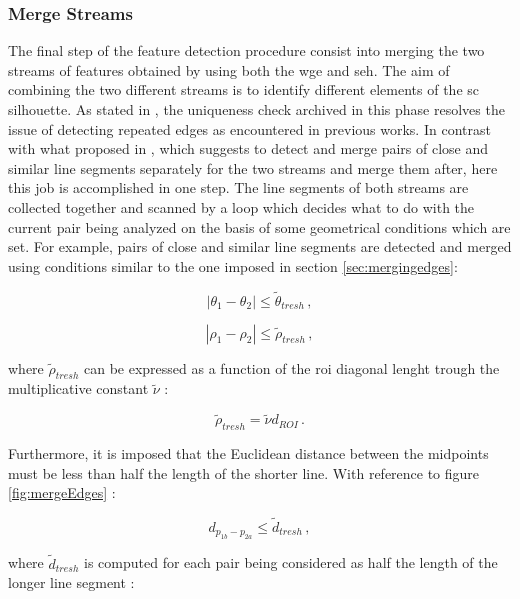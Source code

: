 \subsubsection{Merge Streams}
The final step of  the feature detection procedure consist into merging the two streams of features obtained by using both the \acrshort{wge} and \acrshort{seh}. The aim of combining the two different streams is to identify different elements of the \acrshort{sc} silhouette. As stated in \cite{Sharma2018}, the uniqueness check archived in this phase resolves the issue of detecting repeated edges as encountered in previous works. 
In contrast with what proposed in \cite{Sharma2018}, which suggests to detect and merge pairs of close and similar line segments separately for the two streams and merge them after, here this job is accomplished in one step. The line segments of both streams are collected together and scanned by a loop which decides what to do with the current pair being analyzed on the basis of some geometrical conditions which are set.
For example, pairs of close and similar line segments are detected and merged using conditions similar to the one imposed in section \ref{sec:mergingedges}: 

\begin{equation}
|\theta_1 - \theta_2| \leqslant \tilde{\theta}_{tresh} \,,
\end{equation}

\begin{equation}
|\rho_1 - \rho_2| \leqslant	\tilde{\rho}_{tresh} \,,
\end{equation}

where $\tilde{\rho}_{tresh}$ can be expressed as a function of the \acrshort{roi} diagonal lenght trough the multiplicative constant $\tilde{\nu}$ \cite{fracchio2019}:

\begin{equation}
\tilde{\rho}_{tresh} = \tilde{\nu} d_{ROI} \,.
\end{equation}

Furthermore, it is imposed that the Euclidean distance between the midpoints must be less than half the length of the shorter line. With reference to figure \ref{fig:mergeEdges} :

\begin{equation}
d_{p_{1b}-p_{2a}} \leqslant \tilde{d}_{tresh} \,,
\end{equation}

where $\tilde{d}_{tresh}$ is computed for each pair being considered as half the length of the longer line segment :


